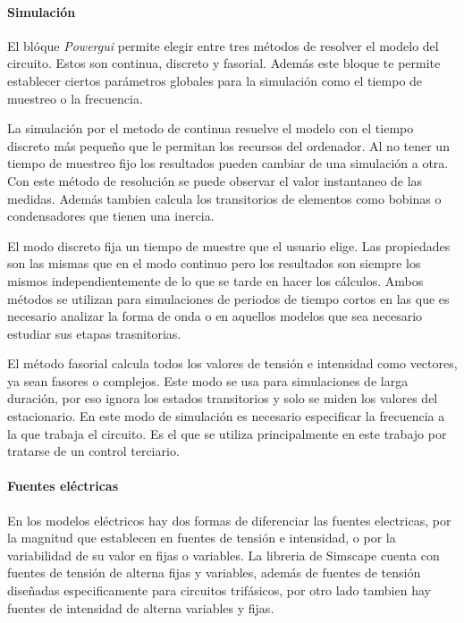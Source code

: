 \documentclass{book}
\begin{document}
		\paragraph {Simulaci\'on}
El bl\'oque \emph{Powergui} permite elegir entre tres m\'etodos de resolver el modelo del circuito. Estos son continua, discreto y fasorial. Adem\'as este bloque te permite establecer ciertos par\'ametros globales para la simulaci\'on como el tiempo de muestreo o la frecuencia.  \par

La simulaci\'on por el metodo de continua resuelve el modelo con el tiempo discreto m\'as pequeño que le permitan los recursos del ordenador. Al no tener un tiempo de muestreo fijo los resultados pueden cambiar de una simulaci\'on a otra. Con este m\'etodo de resoluci\'on se puede observar el valor instantaneo de las medidas. Adem\'as tambien calcula  los transitorios de elementos como bobinas o condensadores que tienen una inercia. \par

El modo discreto fija un tiempo de muestre que el usuario elige. Las propiedades son las mismas que en el modo continuo pero los resultados son siempre los mismos independientemente de lo que se tarde en hacer los c\'alculos. Ambos m\'etodos se utilizan para simulaciones de periodos de tiempo cortos en las que es necesario analizar la forma de onda o en aquellos modelos que sea necesario estudiar sus etapas trasnitorias. \par

El m\'etodo fasorial calcula todos los valores de tensi\'on e intensidad como vectores, ya sean fasores o complejos. Este modo se usa para simulaciones de larga duraci\'on, por eso ignora los estados transitorios y solo se miden los valores del estacionario. En este modo de simulaci\'on es necesario especificar la frecuencia a la que trabaja el circuito. Es el que se utiliza principalmente en este trabajo por tratarse de un control terciario. \par

		\paragraph {Fuentes el\'ectricas}
En los modelos el\'ectricos hay dos formas de diferenciar las fuentes electricas, por la magnitud que establecen en fuentes de tensi\'on e intensidad, o por la variabilidad de su valor en fijas o variables. La libreria de Simscape cuenta con fuentes de tensi\'on de alterna fijas y variables, además de fuentes de tensi\'on diseñadas especificamente para circuitos trif\'asicos, por otro lado tambien hay fuentes de intensidad de alterna variables y fijas. \par
\end{document}
